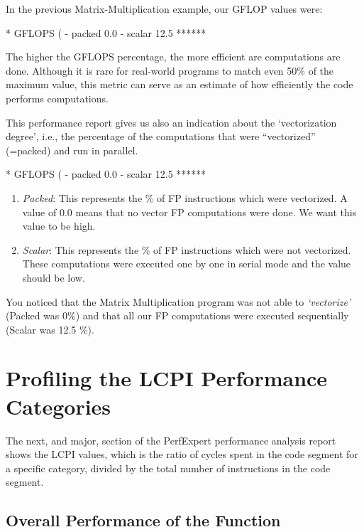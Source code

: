 In the previous Matrix-Multiplication example, our GFLOP values were:
\begin{prompt}
* GFLOPS (%
  - packed                0.0
  - scalar               12.5 ******
\end{prompt}

The higher the GFLOPS percentage, the more efficient are computations are done. Although it is rare for real-world programs to match even 50\% of the maximum value, this metric can serve as an estimate of how efficiently the code performs computations.

This performance report gives us also an indication about the `vectorization degree', i.e., the percentage of the computations that were ``vectorized'' (=packed) and run in parallel.

\begin{prompt}
* GFLOPS (%
  - packed                0.0
  - scalar               12.5 ******
\end{prompt}

\begin{enumerate}
  \item  \emph{Packed}: This represents the \% of FP instructions which were vectorized. A value of 0.0 means that no vector FP computations were done. We want this value to be high.
  \item  \emph{Scalar}: This represents the \% of FP instructions which were not vectorized. These computations were executed one by one in serial mode and the value should be low.
\end{enumerate}

You noticed that the Matrix Multiplication program was not able to \emph{`vectorize'} (Packed was 0\%) and that all our FP computations were executed sequentially (Scalar was 12.5 \%).

\section{Profiling the LCPI Performance Categories}
\label{sec:Profiling_the_LCPI_Performance_Categories}

The next, and major, section of the PerfExpert performance analysis report shows the LCPI values, which is the ratio of cycles spent in the code segment for a specific category, divided by the total number of instructions in the code segment.

\subsection{Overall Performance of the Function}
\label{subsec:Overall_Performance}

